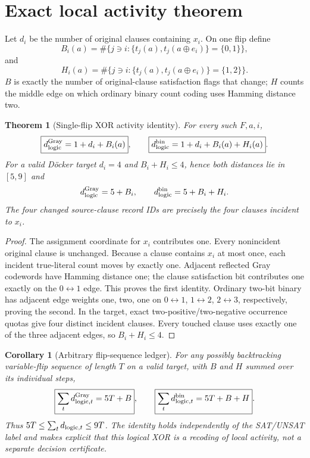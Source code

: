 \documentclass[11pt]{article}
\newtheorem{theorem}{Theorem}
\newtheorem{corollary}{Corollary}
\begin{document}
\section{Exact local activity theorem}
Let $d_i$ be the number of original clauses containing $x_i$.  On one flip define
\[
 B_i(a)=\#\{j\ni i:\{t_j(a),t_j(a\oplus e_i)\}=\{0,1\}\},
\]
and
\[
 H_i(a)=\#\{j\ni i:\{t_j(a),t_j(a\oplus e_i)\}=\{1,2\}\}.
\]
$B$ is exactly the number of original-clause satisfaction flags that change; $H$ counts
the middle edge on which ordinary binary count coding uses Hamming distance two.

\begin{theorem}[Single-flip XOR activity identity]\label{thm:local}
For every such $F,a,i$,
\[
 \boxed{d_{\rm logic}^{\rm Gray}=1+d_i+B_i(a)},\qquad
 \boxed{d_{\rm logic}^{\rm bin}=1+d_i+B_i(a)+H_i(a)}.
\]
For a valid D\"ocker target $d_i=4$ and $B_i+H_i\le4$, hence both distances lie in
$[5,9]$ and
\[
 d_{\rm logic}^{\rm Gray}=5+B_i,
 \qquad d_{\rm logic}^{\rm bin}=5+B_i+H_i.
\]
The four changed source-clause record IDs are precisely the four clauses incident to
$x_i$.
\end{theorem}
\begin{proof}
The assignment coordinate for $x_i$ contributes one.  Every nonincident original clause
is unchanged.  Because a clause contains $x_i$ at most once, each incident true-literal
count moves by exactly one.  Adjacent reflected Gray codewords have Hamming distance one;
the clause satisfaction bit contributes one exactly on the $0\leftrightarrow1$ edge.
This proves the first identity.  Ordinary two-bit binary has adjacent edge weights one,
two, one on $0\leftrightarrow1$, $1\leftrightarrow2$, $2\leftrightarrow3$,
respectively, proving the second.  In the target, exact two-positive/two-negative
occurrence quotas give four distinct incident clauses.  Every touched clause uses exactly
one of the three adjacent edges, so $B_i+H_i\le4$.
\end{proof}

\begin{corollary}[Arbitrary flip-sequence ledger]\label{cor:sequence}
For any possibly backtracking variable-flip sequence of length $T$ on a valid target,
with $B$ and $H$ summed over its individual steps,
\[
 \boxed{\sum_t d_{{\rm logic},t}^{\rm Gray}=5T+B},\qquad
 \boxed{\sum_t d_{{\rm logic},t}^{\rm bin}=5T+B+H}.
\]
Thus $5T\le\sum_t d_{{\rm logic},t}\le9T$.  The identity holds independently of the
SAT/UNSAT label and makes explicit that this logical XOR is a recoding of local activity,
not a separate decision certificate.
\end{corollary}
\end{document}
